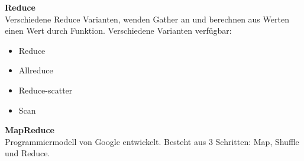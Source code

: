 \textbf{Reduce}\\
Verschiedene Reduce Varianten, wenden Gather an und berechnen aus Werten einen Wert durch Funktion.
Verschiedene Varianten verfügbar:
\begin{itemize}
  \item Reduce
  \item Allreduce
  \item Reduce-scatter
  \item Scan
\end{itemize}


\textbf{MapReduce}\\
Programmiermodell von Google entwickelt.
Besteht aus 3 Schritten: Map, Shuffle und Reduce.


  

